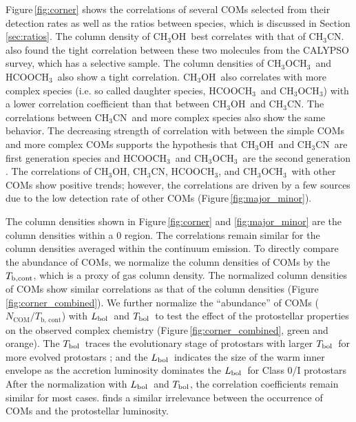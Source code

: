\documentclass[twocolumn]{aastex62}
\newcommand{\lbol}{\mbox{$L_{\rm bol}$}}
\newcommand{\tbol}{\mbox{$T_{\rm bol}$}}
\newcommand{\tbc}{\mbox{$T_{\rm b, cont}$}}
\newcommand{\methylformate}{\mbox{HCOOCH$_{3}$}}
\newcommand{\methanol}{\mbox{CH$_{3}$OH}}
\newcommand{\dimethylether}{\mbox{CH$_{3}$OCH$_{3}$}}
\newcommand{\methylcyanide}{\mbox{CH$_{3}$CN}}
\begin{document}
Figure\,\ref{fig:corner} shows the correlations of several COMs selected from their detection rates as well as the ratios between species, which is discussed in Section\,\ref{sec:ratios}.  The column density of \methanol\ best correlates with that of \methylcyanide.  \citet{2020AA...635A.198B} also found the tight correlation between these two molecules from the CALYPSO survey, which has a selective sample.  The column densities of \dimethylether\ and \methylformate\ also show a tight correlation.  \methanol\ also correlates with more complex species (i.e. so called daughter species, \methylformate\ and \dimethylether) with a lower correlation coefficient than that between \methanol\ and \methylcyanide.  The correlations between \methylcyanide\ and more complex species also show the same behavior.  The decreasing strength of correlation with between the simple COMs and more complex COMs supports the hypothesis that \methanol\ and \methylcyanide\ are first generation species and \methylformate\ and \dimethylether\ are the second generation \citep{2009ARAA..47..427H}.  The correlations of \methanol, \methylcyanide, \methylformate, and \dimethylether\ with other COMs show positive trends; however, the correlations are driven by a few sources due to the low detection rate of other COMs (Figure\,\ref{fig:major_minor}).

The column densities shown in Figure\,\ref{fig:corner} and \ref{fig:major_minor} are the column densities within a 0 region.  The correlations remain similar for the column densities averaged within the continuum emission.  To directly compare the abundance of COMs, we normalize the column densities of COMs by the \tbc, which is a proxy of gas column density.  The normalized column densities of COMs show similar correlations as that of the column densities (Figure\,\ref{fig:corner_combined}).  We further normalize the ``abundance'' of COMs ($N_\text{COM}/T_\text{b, cont}$) with \lbol\ and \tbol\ to test the effect of the protostellar properties on the observed complex chemistry (Figure\,\ref{fig:corner_combined}, green and orange).  The \tbol\ traces the evolutionary stage of protostars with larger \tbol\ for more evolved protostars \citep{1993ApJ...413L..47M,1995ApJ...445..377C}; and the \lbol\ indicates the size of the warm inner envelope as the accretion luminosity dominates the \lbol\ for Class 0/I protostars \citep{2014prpl.conf..195D}  After the normalization with \lbol\ and \tbol, the correlation coefficients remain similar for most cases.  \citet{2020arXiv200506784V} finds a similar irrelevance between the occurrence of COMs and the protostellar luminosity.  
\end{document}
